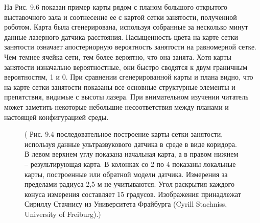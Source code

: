 \documentclass[10pt,a4paper]{article}
\begin{document}
На Рис. 9.6 показан пример карты рядом с планом большого открытого выставочного зала и соотнесение ее с картой сетки занятости, полученной роботом. Карта была сгенерирована, используя собранные за несколько минут данные лазерного датчика расстояния. Насыщенность цвета на карте сетки занятости означает апостериорную вероятность занятости на равномерной сетке. Чем темнее ячейка сети, тем более вероятно, что она занята. Хотя карты занятости изначально вероятностные, они быстро сводятся к двум граничным вероятностям, 1 и 0. При сравнении сгенерированной карты и плана видно, что на карте сетки занятости показаны все основные структурные элементы и препятствия, видимые с высоты лазера. При внимательном изучении читатель может заметить некоторые небольшие несоответствия между планами и настоящей конфигурацией среды.

\begin{figure}[H]
	\caption{ ( Рис. 9.4 последовательное построение карты сетки занятости, используя данные ультразвукового датчика в среде в виде коридора. В левом верхнем углу показана начальная карта, а в правом нижнем – результирующая карта. В колонках со 2 по 4 показаны локальные карты, построенные или обратной модели датчика. Измерения за пределами радиуса 2,5 м не учитываются. Угол раскрытия каждого конуса измерения составляет 15 градусов. Изображения принадлежат Сириллу Стачнису из Университета Фрайбурга (Cyrill Stachniss, University of Freiburg).)}
	\label{fig:94orig}
\end{figure}
\end{document}
